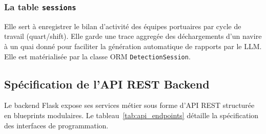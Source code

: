 \documentclass[12pt,a4paper]{article}
\begin{document}
\subsubsection{La table \texttt{sessions}}
Elle sert à enregistrer le bilan d'activité des équipes portuaires par cycle de travail (quart/shift). Elle garde une trace aggregée des déchargements d'un navire à un quai donné pour faciliter la génération automatique de rapports par le LLM. Elle est matérialisée par la classe ORM \texttt{DetectionSession}.

\subsection{Spécification de l'API REST Backend}

Le backend Flask expose ses services métier sous forme d'API REST structurée en blueprints modulaires. Le tableau~\ref{tab:api_endpoints} détaille la spécification des interfaces de programmation.
\end{document}
